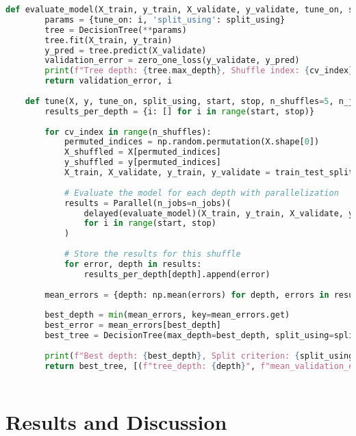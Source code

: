 \documentclass{article}
\begin{document}
\begin{lstlisting}[language=Python, caption=Hyperparameter Tuning Function]
    def evaluate_model(X_train, y_train, X_validate, y_validate, tune_on, split_using, i, cv_index):
        params = {tune_on: i, 'split_using': split_using}
        tree = DecisionTree(**params)
        tree.fit(X_train, y_train)
        y_pred = tree.predict(X_validate)
        validation_error = zero_one_loss(y_validate, y_pred)
        print(f"Tree depth: {tree.max_depth}, Shuffle index: {cv_index}, Validation error: {validation_error}")
        return validation_error, i
    
    def tune(X, y, tune_on, split_using, start, stop, n_shuffles=5, n_jobs=-1):
        results_per_depth = {i: [] for i in range(start, stop)}
        
        for cv_index in range(n_shuffles):
            permuted_indices = np.random.permutation(X.shape[0])
            X_shuffled = X[permuted_indices]
            y_shuffled = y[permuted_indices]
            X_train, X_validate, y_train, y_validate = train_test_split(X_shuffled, y_shuffled, test_size=0.2)
            
            # Evaluate the model for each depth with parallelization
            results = Parallel(n_jobs=n_jobs)(
                delayed(evaluate_model)(X_train, y_train, X_validate, y_validate, tune_on, split_using, i, cv_index)
                for i in range(start, stop)
            )
            
            # Store the results for this shuffle
            for error, depth in results:
                results_per_depth[depth].append(error)
            
        mean_errors = {depth: np.mean(errors) for depth, errors in results_per_depth.items()}
        
        best_depth = min(mean_errors, key=mean_errors.get)
        best_error = mean_errors[best_depth]
        best_tree = DecisionTree(max_depth=best_depth, split_using=split_using)
        
        print(f"Best depth: {best_depth}, Split criterion: {split_using}, Mean validation error: {round(best_error * 100, 2)} %")
        return best_tree, [(f"tree_depth: {depth}", f"mean_validation_error: {error}") for depth, error in mean_errors.items()]
    
\end{lstlisting}

\section{Results and Discussion}
\end{document}
